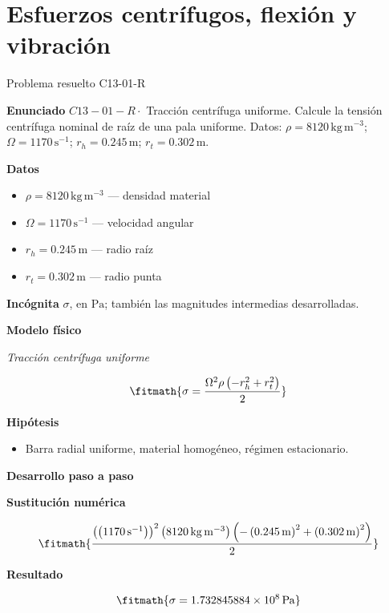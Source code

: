\documentclass[10pt,openany]{book}
\begin{document}
\chapter{Esfuerzos centrífugos, flexión y vibración}
\begin{studiumworked}{Problema resuelto C13-01-R}


\noindent\textbf{Enunciado}
\(C13-01-R \cdot\) Tracción centrífuga uniforme. Calcule la tensión centrífuga nominal de raíz de una pala uniforme. Datos: \(\rho=8120\, \mathrm{kg}\,\mathrm{m}^{-3}\); \(\Omega=1170\, \mathrm{s}^{-1}\); \(r_h=0.245\, \mathrm{m}\); \(r_t=0.302\, \mathrm{m}\).

\noindent\textbf{Datos}
\begin{itemize}
\item $\rho = 8120\,\mathrm{kg}\,\mathrm{m}^{-3}$ — densidad material
\item $\Omega = 1170\,\mathrm{s}^{-1}$ — velocidad angular
\item $r_h = 0.245\,\mathrm{m}$ — radio raíz
\item $r_t = 0.302\,\mathrm{m}$ — radio punta
\end{itemize}

\noindent\textbf{Incógnita}
$\sigma$, en $\mathrm{Pa}$; también las magnitudes intermedias desarrolladas.

\noindent\textbf{Modelo físico}

\noindent\textit{Tracción centrífuga uniforme}

\[
\fitmath{\sigma=\frac{\Omega^{2} \rho \left(- r_h^{2} + r_t^{2}\right)}{2}}
\]

\noindent\textbf{Hipótesis}
\begin{itemize}
\item Barra radial uniforme, material homogéneo, régimen estacionario.
\end{itemize}

\noindent\textbf{Desarrollo paso a paso}



\noindent\textbf{Sustitución numérica}

\[
\fitmath{\frac{\left(\left(1170\,\mathrm{s}^{-1}\right)\right)^{2} \left(8120\,\mathrm{kg}\,\mathrm{m}^{-3}\right) \left(- \left(0.245\,\mathrm{m}\right)^{2} + \left(0.302\,\mathrm{m}\right)^{2}\right)}{2}}
\]

\noindent\textbf{Resultado}

\[
\fitmath{\sigma=1.732845884\times10^{8}\,\mathrm{Pa}}
\]


\end{studiumworked}
\end{document}
